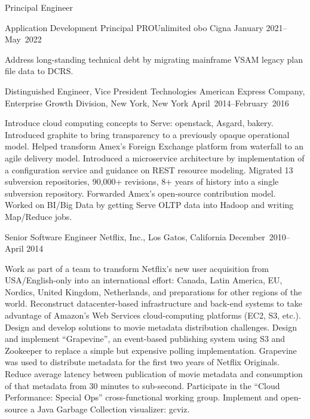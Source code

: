 \documentclass{resume}
\begin{document}
\begin{resume}
\begin{Employment}
\begin{job}{Principal Engineer}
\end{job}

\begin{job}{Application Development Principal}
           {PROUnlimited obo Cigna}
           {January 2021--May~2022}

Address long-standing technical debt by migrating mainframe VSAM legacy plan file data to DCRS.

\end{job}
\begin{job}{Distinguished Engineer, Vice President Technologies}
           {American Express Company, Enterprise Growth Division, New York, New York}
           {April~2014--February~2016}

Introduce cloud computing concepts to Serve: openstack, Asgard,
bakery. Introduced graphite to bring transparency to a previously
opaque operational model. Helped transform Amex's Foreign Exchange
platform from waterfall to an agile delivery model. Introduced a
microservice architecture by implementation of a configuration service
and guidance on REST resource modeling. Migrated 13 subversion
repositories, 90,000+ revisions, 8+ years of history into a single
subversion repository. Forwarded Amex's open-source contribution
model. Worked on BI/Big Data by getting Serve OLTP data into Hadoop
and writing Map/Reduce jobs.

\end{job}
\begin{job}{Senior Software Engineer}
           {Netflix, Inc., Los Gatos, California}
           {December~2010--April 2014}

Work as part of a team to transform Netflix's new user acquisition
from USA/English-only into an international effort: Canada, Latin
America, EU, Nordics, United Kingdom, Netherlands, and preparations
for other regions of the world. Reconstruct datacenter-based
infrastructure and back-end systems to take advantage of Amazon's Web
Services cloud-computing platforms (EC2, S3, etc.).  Design and
develop solutions to movie metadata distribution challenges.  Design
and implement ``Grapevine'', an event-based publishing system using S3
and Zookeeper to replace a simple but expensive polling
implementation. Grapevine was used to distribute metadata for the
first two years of Netflix Originals. Reduce average latency between
publication of movie metadata and consumption of that metadata from 30
minutes to sub-second.  Participate in the ``Cloud Performance:
Special Ops'' cross-functional working group. Implement and
open-source a Java Garbage Collection visualizer: gcviz.


\end{job}
\end{Employment}
\end{resume}
\end{document}
